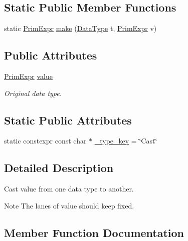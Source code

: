 \subsection*{Static Public Member Functions}
\begin{DoxyCompactItemize}
\item 
static \hyperlink{classtvm_1_1PrimExpr}{Prim\+Expr} \hyperlink{classtvm_1_1tir_1_1CastNode_a240f630f69e4f41d66b8cfead5f50681}{make} (\hyperlink{namespacetvm_a41918af1a1dc386388639a9d3ad06c5d}{Data\+Type} t, \hyperlink{classtvm_1_1PrimExpr}{Prim\+Expr} v)
\end{DoxyCompactItemize}
\subsection*{Public Attributes}
\begin{DoxyCompactItemize}
\item 
\hyperlink{classtvm_1_1PrimExpr}{Prim\+Expr} \hyperlink{classtvm_1_1tir_1_1CastNode_a6075e57a3e8dd0f751d7997cafb9bce0}{value}
\begin{DoxyCompactList}\small\item\em Original data type. \end{DoxyCompactList}\end{DoxyCompactItemize}
\subsection*{Static Public Attributes}
\begin{DoxyCompactItemize}
\item 
static constexpr const char $\ast$ \hyperlink{classtvm_1_1tir_1_1CastNode_ad9b8ef8c5a3bb223c4d19503007af162}{\+\_\+type\+\_\+key} = \char`\"{}Cast\char`\"{}
\end{DoxyCompactItemize}


\subsection{Detailed Description}
Cast value from one data type to another. 

\begin{DoxyNote}{Note}
The lanes of value should keep fixed. 
\end{DoxyNote}


\subsection{Member Function Documentation}
